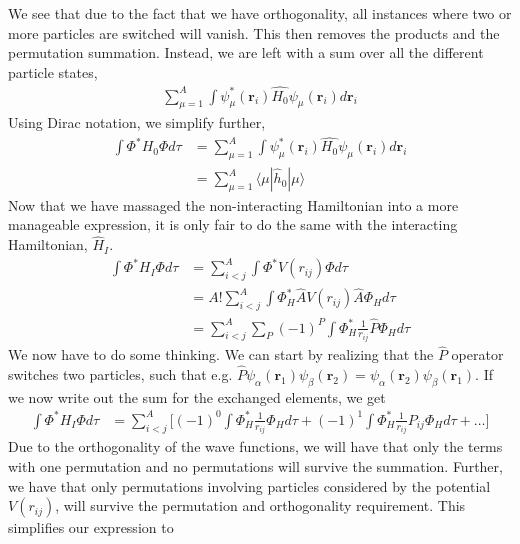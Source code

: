 \documentclass[11pt]{article}
\begin{document}
We see that due to the fact that we have orthogonality, all instances where two or more particles are switched will vanish. This then removes the products and the permutation summation. Instead, we are left with a sum over all the different particle states,
\begin{align*}
	\sum^A_{\mu=1} \int \psi^*_\mu(\mathbf{r}_i) \hat{H_0} \psi_\mu(\mathbf{r}_i) d\mathbf{r}_i
\end{align*}
Using Dirac notation, we simplify further, 
\begin{align}
	\int \Phi^* H_0 \Phi d\tau &= \sum^A_{\mu=1} \int \psi^*_\mu(\mathbf{r}_i) \hat{H_0} \psi_\mu(\mathbf{r}_i) d\mathbf{r}_i \nonumber \\
	&= \sum^A_{\mu=1} \langle \mu |\hat{h}_0|\mu\rangle
	\label{eq:non-interaction-hamilton}
\end{align}
Now that we have massaged the non-interacting Hamiltonian into a more manageable expression, it is only fair to do the same with the interacting Hamiltonian, $\hat{H}_I$.
\begin{align*}
	\int \Phi^* H_I \Phi d\tau &= \sum^A_{i<j} \int \Phi^* V(r_{ij}) \Phi d\tau \\
	&= A! \sum^A_{i<j} \int \Phi_H^* \hat{A} V(r_{ij}) \hat{A} \Phi_H d\tau \\
	&= \sum^A_{i<j} \sum_P (-1)^P \int \Phi_H^* \frac{1}{r_{ij}} \hat{P} \Phi_H d\tau
\end{align*}
We now have to do some thinking. We can start by realizing that the $\hat{P}$ operator switches two particles, such that e.g. $\hat{P}\psi_\alpha(\mathbf{r}_1)\psi_\beta(\mathbf{r}_2) = \psi_\alpha(\mathbf{r}_2)\psi_\beta(\mathbf{r}_1)$. If we now write out the sum for the exchanged elements, we get
\begin{align*}
	\int \Phi^* H_I \Phi d\tau &= \sum^A_{i<j} \bigg[ (-1)^0 \int \Phi_H^* \frac{1}{r_{ij}} \Phi_H d\tau + (-1)^1 \int \Phi_H^* \frac{1}{r_{ij}} P_{ij} \Phi_H d\tau + \dots \bigg]
\end{align*}
Due to the orthogonality of the wave functions, we will have that only the terms with one permutation and no permutations will survive the summation. Further, we have that only permutations involving particles considered by the potential $V(r_{ij})$, will survive the permutation and orthogonality requirement. This simplifies our expression to
\end{document}

